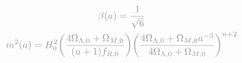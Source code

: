 \documentclass[preview]{standalone}
\begin{document}
\begin{gather}
\notag
\textcolor{Gray}{\beta(a) = \frac{1}{\sqrt{6}}} \\ 
\notag
\textcolor{Gray}{m^2(a) = H_0^2 \biggl( \frac{4 \Omega_{\Lambda, 0} + \Omega_{M,0}}{(n+1)f_{R,0}} \biggr) \biggl(  \frac{4 \Omega_{\Lambda, 0} + \Omega_{M,0}a^{-3}}{4 \Omega_{\Lambda, 0} + \Omega_{M,0}} \biggr)^{n+2}} 
\end{gather}
\end{document}
